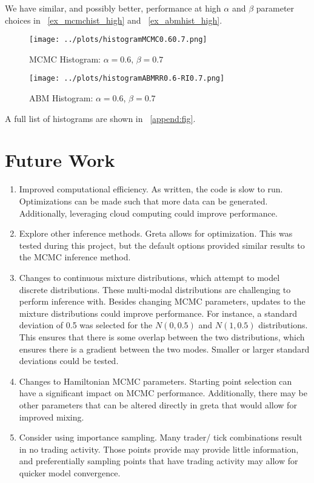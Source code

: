 \documentclass[a4paper, 11pt]{report}
\begin{document}
\noindent We have similar, and possibly better, performance at high $\alpha$ and $\beta$ parameter choices in ~\autoref{ex_mcmchist_high} and ~\autoref{ex_abmhist_high}.

\begin{figure}[h!] 
\caption{MCMC Histogram: $\alpha = 0.6$, $\beta=0.7$ }
\label{ex_mcmchist_high}
 \texttt{[image: ../plots/histogramMCMC0.60.7.png]} 
\end{figure}

\begin{figure}[h!] \caption{ABM Histogram: $\alpha = 0.6$, $\beta=0.7$ }
\label{ex_abmhist_high} \texttt{[image: ../plots/histogramABMRR0.6-RI0.7.png]} 
\end{figure}

\noindent A full list of histograms are shown in ~\autoref{append:fig}.

\chapter{Future Work}\label{future_work}

\begin{enumerate}
\item Improved computational efficiency. As written, the code is slow to run. Optimizations can be made such that more data can be generated. Additionally, leveraging cloud computing could improve performance.
\item Explore other inference methods. Greta allows for optimization. This was tested during this project, but the default options provided similar results to the MCMC inference method.
\item Changes to continuous mixture distributions, which attempt to model discrete distributions. These multi-modal distributions are challenging to perform inference with. Besides changing MCMC parameters, updates to the mixture distributions could improve performance. For instance, a standard deviation of 0.5 was selected for the $N(0,0.5)$ and $N(1,0.5)$ distributions. This ensures that there is some overlap between the two distributions, which ensures there is a gradient between the two modes. Smaller or larger standard deviations could be tested.
\item Changes to Hamiltonian MCMC parameters. Starting point selection can have a significant impact on MCMC performance. Additionally, there may be other parameters that can be altered directly in greta that would allow for improved mixing.
\item Consider using importance sampling. Many trader/ tick combinations result in no trading activity. Those points provide may provide little information, and preferentially sampling points that have trading activity may allow for quicker model convergence.
\end{enumerate}
\end{document}
